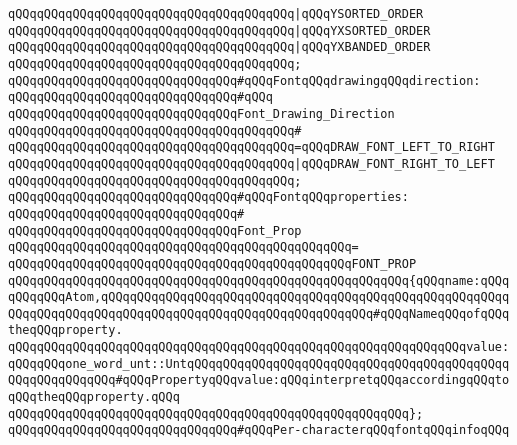 \verb|qQQqqQQqqQQqqQQqqQQqqQQqqQQqqQQqqQQqqQQq|\verb#|qQQqYSORTED_ORDER#\newline
\verb|qQQqqQQqqQQqqQQqqQQqqQQqqQQqqQQqqQQqqQQq|\verb#|qQQqYXSORTED_ORDER#\newline
\verb|qQQqqQQqqQQqqQQqqQQqqQQqqQQqqQQqqQQqqQQq|\verb#|qQQqYXBANDED_ORDER#\newline
\verb|qQQqqQQqqQQqqQQqqQQqqQQqqQQqqQQqqQQqqQQq;|\newline
\newline
\verb|qQQqqQQqqQQqqQQqqQQqqQQqqQQqqQQq#qQQqFontqQQqdrawingqQQqdirection:|\newline
\verb|qQQqqQQqqQQqqQQqqQQqqQQqqQQqqQQq#qQQq|\newline
\verb|qQQqqQQqqQQqqQQqqQQqqQQqqQQqqQQqFont_Drawing_Direction|\newline
\verb|qQQqqQQqqQQqqQQqqQQqqQQqqQQqqQQqqQQqqQQq#|\newline
\verb|qQQqqQQqqQQqqQQqqQQqqQQqqQQqqQQqqQQqqQQq=qQQqDRAW_FONT_LEFT_TO_RIGHT|\newline
\verb|qQQqqQQqqQQqqQQqqQQqqQQqqQQqqQQqqQQqqQQq|\verb#|qQQqDRAW_FONT_RIGHT_TO_LEFT#\newline
\verb|qQQqqQQqqQQqqQQqqQQqqQQqqQQqqQQqqQQqqQQq;|\newline
\newline
\verb|qQQqqQQqqQQqqQQqqQQqqQQqqQQqqQQq#qQQqFontqQQqproperties:|\newline
\verb|qQQqqQQqqQQqqQQqqQQqqQQqqQQqqQQq#|\newline
\verb|qQQqqQQqqQQqqQQqqQQqqQQqqQQqqQQqFont_Prop|\newline
\verb|qQQqqQQqqQQqqQQqqQQqqQQqqQQqqQQqqQQqqQQqqQQqqQQq=|\newline
\verb|qQQqqQQqqQQqqQQqqQQqqQQqqQQqqQQqqQQqqQQqqQQqqQQqFONT_PROP|\newline
\verb|qQQqqQQqqQQqqQQqqQQqqQQqqQQqqQQqqQQqqQQqqQQqqQQqqQQqqQQq{qQQqname:qQQqqQQqqQQqAtom,qQQqqQQqqQQqqQQqqQQqqQQqqQQqqQQqqQQqqQQqqQQqqQQqqQQqqQQqqQQqqQQqqQQqqQQqqQQqqQQqqQQqqQQqqQQqqQQqqQQqqQQqqQQq#qQQqNameqQQqofqQQqtheqQQqproperty.|\newline
\verb|qQQqqQQqqQQqqQQqqQQqqQQqqQQqqQQqqQQqqQQqqQQqqQQqqQQqqQQqqQQqqQQqvalue:qQQqqQQqone_word_unt::UntqQQqqQQqqQQqqQQqqQQqqQQqqQQqqQQqqQQqqQQqqQQqqQQqqQQqqQQqqQQq#qQQqPropertyqQQqvalue:qQQqinterpretqQQqaccordingqQQqtoqQQqtheqQQqproperty.qQQq|\newline
\verb|qQQqqQQqqQQqqQQqqQQqqQQqqQQqqQQqqQQqqQQqqQQqqQQqqQQqqQQq};|\newline
\newline
\verb|qQQqqQQqqQQqqQQqqQQqqQQqqQQqqQQq#qQQqPer-characterqQQqfontqQQqinfoqQQq|\newline
